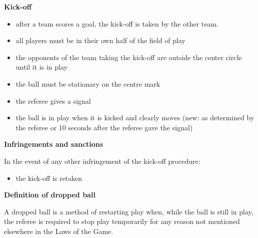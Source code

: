 \bigskip

{\bfseries Kick-off}

\begin{itemize}
\item after a team scores a goal, the kick-off is taken by the other team. 
\item all players must be in their own half of the field of play 
\item the opponents of the team taking the kick-off are outside the center
      circle until it is in play
\item the ball must be stationary on the centre mark
\item the referee gives a signal
\item the ball is in play when it is kicked and clearly moves
      (new: as determined by the referee or 10 seconds after the referee gave the signal)
\end{itemize}

{\bfseries Infringements and sanctions}

\headlinebox


In the event of any other infringement of the kick-off procedure: 

\begin{itemize}
\item the kick-off is retaken
\end{itemize}


{\bfseries Definition of dropped ball}

\headlinebox

A dropped ball is a method of restarting play when, while the ball is still in play, the referee is required to stop play temporarily for any reason not mentioned elsewhere in the Laws of the Game. 

